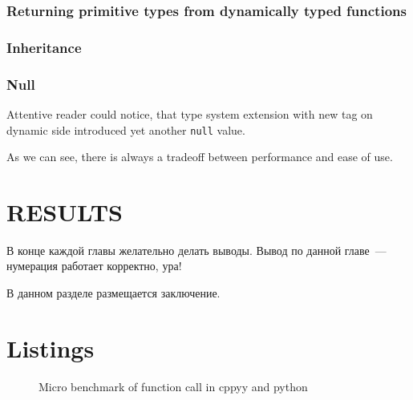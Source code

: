 \documentclass[times, %
               specification,annotation, %
               titlepage-extra-ru,specification-extra-ru,annotation-extra-ru, %
               languages={russian,english} %
              ]{itmo-student-thesis}
\begin{document}
\subsection{Returning primitive types from dynamically typed functions}
\subsection{Inheritance}
\subsection{Null}
Attentive reader could notice, that type system extension with new tag on dynamic side introduced yet another \texttt{null} value.

\chapterconclusion
As we can see, there is always a tradeoff between performance and ease of use.

\chapter{RESULTS}

\chapterconclusion

В конце каждой главы желательно делать выводы. Вывод по данной главе~--- нумерация работает корректно, ура!

\startconclusionpage

В данном разделе размещается заключение.

\printmainbibliography

\appendix

\chapter{Listings}
\begin{figure}[!h]
    \caption{Micro benchmark of function call in cppyy and python}\label{apx:cppyy-bench}
    
\end{figure}
\end{document}
